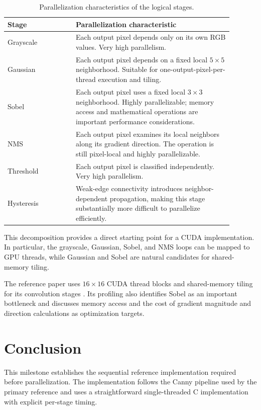 \documentclass[conference]{IEEEtran}
\begin{document}
\begin{table}[H]
\centering
\caption{Parallelization characteristics of the logical stages.}
\begin{tabular}{p{0.27\linewidth}|p{0.62\linewidth}}
\toprule
Stage & Parallelization characteristic\\
\midrule
Grayscale &
Each output pixel depends only on its own RGB values. Very high
parallelism.\\

Gaussian &
Each output pixel depends on a fixed local $5\times5$ neighborhood.
Suitable for one-output-pixel-per-thread execution and tiling.\\

Sobel &
Each output pixel uses a fixed local $3\times3$ neighborhood. Highly
parallelizable; memory access and mathematical operations are important
performance considerations.\\

NMS &
Each output pixel examines its local neighbors along its gradient
direction. The operation is still pixel-local and highly parallelizable.\\

Threshold &
Each output pixel is classified independently. Very high parallelism.\\

Hysteresis &
Weak-edge connectivity introduces neighbor-dependent propagation, making
this stage substantially more difficult to parallelize efficiently.\\
\bottomrule
\end{tabular}
\end{table}

This decomposition provides a direct starting point for a CUDA
implementation. In particular, the grayscale, Gaussian, Sobel, and NMS
loops can be mapped to GPU threads, while Gaussian and Sobel are natural
candidates for shared-memory tiling.

The reference paper uses $16\times16$ CUDA thread blocks and shared-memory
tiling for its convolution stages \cite{horvath2023}. Its profiling also
identifies Sobel as an important bottleneck and discusses memory access and
the cost of gradient magnitude and direction calculations as optimization
targets.

\section{Conclusion}

This milestone establishes the sequential reference implementation required
before parallelization. The implementation follows the Canny pipeline used
by the primary reference and uses a straightforward single-threaded C
implementation with explicit per-stage timing.
\end{document}
